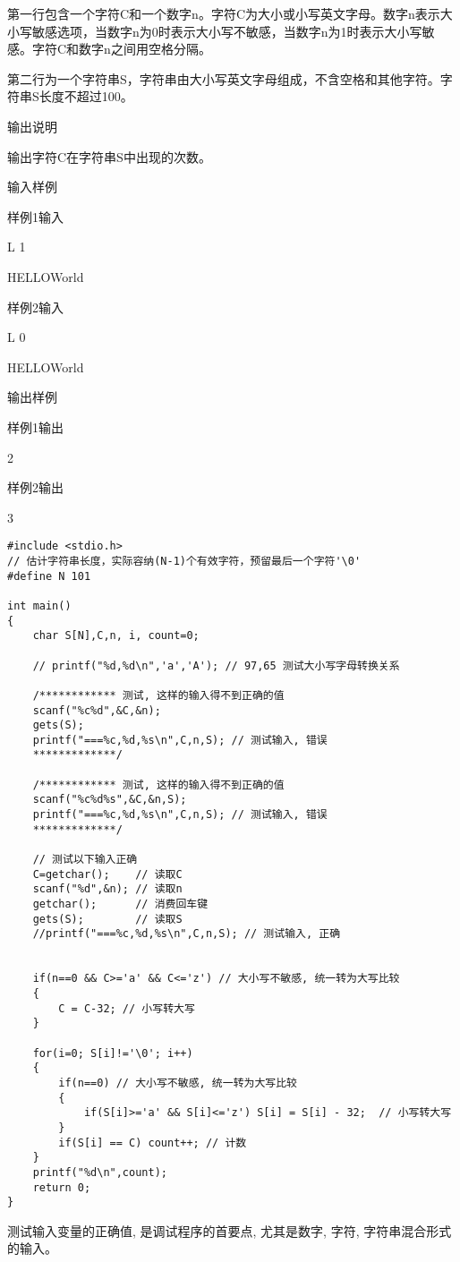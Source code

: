 第一行包含一个字符C和一个数字n。字符C为大小或小写英文字母。数字n表示大小写敏感选项，当数字n为0时表示大小写不敏感，当数字n为1时表示大小写敏感。字符C和数字n之间用空格分隔。

第二行为一个字符串S，字符串由大小写英文字母组成，不含空格和其他字符。字符串S长度不超过100。

输出说明
	
输出字符C在字符串S中出现的次数。

输入样例

样例1输入

L 1

HELLOWorld

样例2输入

L 0

HELLOWorld

输出样例

样例1输出	

2

样例2输出

3

\begin{lstlisting}
#include <stdio.h>
// 估计字符串长度，实际容纳(N-1)个有效字符，预留最后一个字符'\0'
#define N 101 

int main()
{
	char S[N],C,n, i, count=0;
	
	// printf("%d,%d\n",'a','A'); // 97,65 测试大小写字母转换关系 
	
	/************ 测试, 这样的输入得不到正确的值 
	scanf("%c%d",&C,&n);
	gets(S);
	printf("===%c,%d,%s\n",C,n,S); // 测试输入, 错误 
	*************/ 
	
	/************ 测试, 这样的输入得不到正确的值
	scanf("%c%d%s",&C,&n,S);
	printf("===%c,%d,%s\n",C,n,S); // 测试输入, 错误 
	*************/ 
	
	// 测试以下输入正确 
	C=getchar();    // 读取C 
	scanf("%d",&n); // 读取n 
	getchar();      // 消费回车键 
	gets(S);        // 读取S 
	//printf("===%c,%d,%s\n",C,n,S); // 测试输入, 正确 
	
	
	if(n==0 && C>='a' && C<='z') // 大小写不敏感, 统一转为大写比较 
	{
		C = C-32; // 小写转大写 
	} 
	
	for(i=0; S[i]!='\0'; i++) 
	{
		if(n==0) // 大小写不敏感, 统一转为大写比较 
		{
			if(S[i]>='a' && S[i]<='z') S[i] = S[i] - 32;  // 小写转大写 
		}
		if(S[i] == C) count++; // 计数 
	}
	printf("%d\n",count);
	return 0;
} 
\end{lstlisting}

\begin{note}[要点]
	测试输入变量的正确值, 是调试程序的首要点, 尤其是数字, 字符, 字符串混合形式的输入。
\end{note}


